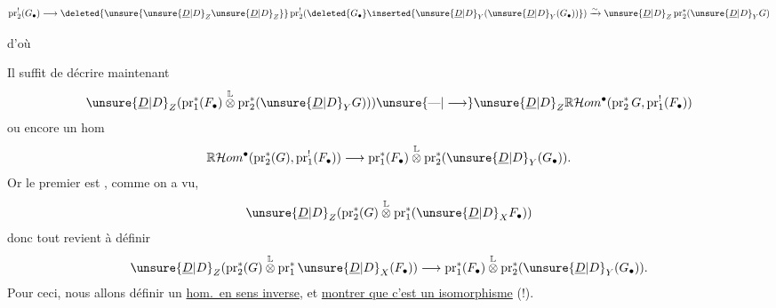 \[
\operatorname{pr}_2^!(G_\bullet)\longrightarrow\deleted{\unsure{\unsure{\underline{D}|D}_Z\unsure{\underline{D}|D}_Z}}\operatorname{pr}_2^!(\deleted{G_\bullet}\inserted{\unsure{\underline{D}|D}_Y(\unsure{\underline{D}|D}_Y(G_\bullet))})\xrightarrow{\sim}\unsure{\underline{D}|D}_Z\operatorname{pr}_2^*(\unsure{\underline{D}|D}_Y G)
\]

d'où

Il suffit de décrire maintenant
\[
\unsure{\underline{D}|D}_Z(\operatorname{pr}_1^*(F_\bullet)\overset{\mathbb{L}}{\otimes}\operatorname{pr}_2^*(\unsure{\underline{D}|D}_Y G)))\unsure{\text{---}|\longrightarrow}\unsure{\underline{D}|D}_Z\mathbb{R}\mathcal{H}om^\bullet(\operatorname{pr}_2^*G,\operatorname{pr}_1^!(F_\bullet))
\]
 ou encore un hom
\[
\mathbb{R}\mathcal{H}om^\bullet(\operatorname{pr}_2^*(G),\operatorname{pr}_1^!(F_\bullet))\longrightarrow\operatorname{pr}_1^*(F_\bullet)\overset{\mathbb{L}}{\otimes}\operatorname{pr}_2^*(\unsure{\underline{D}|D}_Y(G_\bullet)).
\]
Or le premier est , comme on a vu, 
\[
\unsure{\underline{D}|D}_Z(\operatorname{pr}_2^*(G)\overset{\mathbb{L}}{\otimes}\operatorname{pr}_1^*(\unsure{\underline{D}|D}_X F_\bullet))
\]
donc tout revient à définir
\[
\unsure{\underline{D}|D}_Z(\operatorname{pr}_2^*(G)\overset{\mathbb{L}}{\otimes}\operatorname{pr}_1^*\unsure{\underline{D}|D}_X(F_\bullet))\longrightarrow\operatorname{pr}_1^*(F_\bullet)\overset{\mathbb{L}}{\otimes}\operatorname{pr}_2^*(\unsure{\underline{D}|D}_Y(G_\bullet)).
\]
Pour ceci, nous allons définir un \uline{hom.\ en sens inverse}, et \uline{montrer que c'est un isomorphisme} (!).


